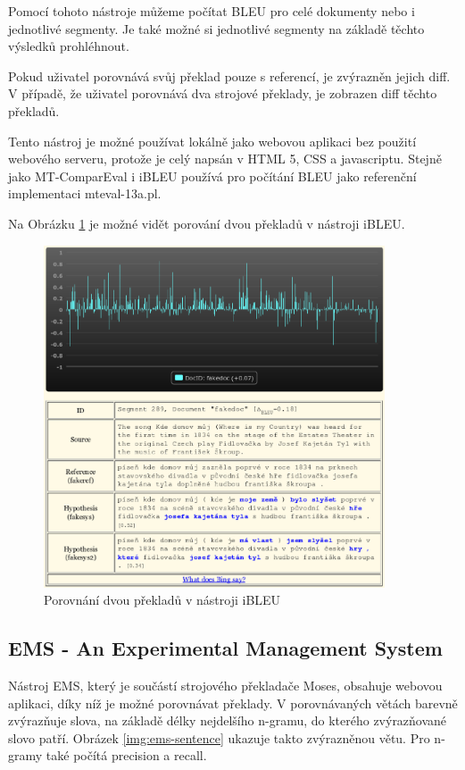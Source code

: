 Pomocí tohoto nástroje můžeme počítat BLEU pro celé dokumenty nebo i jednotlivé segmenty.
Je také možné si jednotlivé segmenty na základě těchto výsledků prohléhnout.

Pokud uživatel porovnává svůj překlad pouze s referencí,
  je zvýrazněn jejich diff.
V případě, že uživatel porovnává dva strojové překlady,
  je zobrazen diff těchto překladů.

Tento nástroj je možné používat lokálně jako webovou aplikaci bez použití webového serveru,
  protože je celý napsán v HTML 5, CSS a javascriptu.
Stejně jako MT-ComparEval i iBLEU používá pro počítání BLEU jako referenční implementaci mteval-13a.pl.

Na Obrázku \ref{img:ibleu} je možné vidět porování dvou překladů v nástroji iBLEU.
\begin{figure}
  \center
  \includegraphics[width=0.9\textwidth]{img/ibleu.eps}
  \caption{Porovnání dvou překladů v nástroji iBLEU}
  \label{img:ibleu}
\end{figure}


\subsection{EMS - An Experimental Management System}
Nástroj EMS,
  který je součástí strojového překladače Moses,
  obsahuje webovou aplikaci,
  díky níž je možné porovnávat překlady.
V porovnávaných větách barevně zvýrazňuje slova,
  na základě délky nejdelšího n-gramu,
  do kterého zvýrazňované slovo patří.
Obrázek \ref{img:ems-sentence} ukazuje takto zvýrazněnou větu.
Pro n-gramy také počítá precision a recall.

